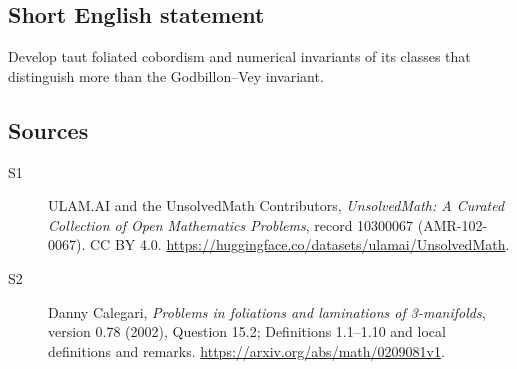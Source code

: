 \documentclass[11pt]{article}
\begin{document}
\subsection{Short English statement}
Develop taut foliated cobordism and numerical invariants of its classes that distinguish more than the Godbillon--Vey invariant.
\subsection{Sources}
\begin{description}
\item[\hypertarget{source:10300067:1}{S1}] ULAM.AI and the UnsolvedMath Contributors, \emph{UnsolvedMath: A Curated Collection of Open Mathematics Problems}, record 10300067 (AMR-102-0067). CC BY 4.0. \url{https://huggingface.co/datasets/ulamai/UnsolvedMath}.
\item[\hypertarget{source:10300067:2}{S2}] Danny Calegari, \emph{Problems in foliations and laminations of 3-manifolds}, version 0.78 (2002), Question 15.2; Definitions 1.1--1.10 and local definitions and remarks. \url{https://arxiv.org/abs/math/0209081v1}.
\end{description}
\label{end:10300067}
\end{document}
